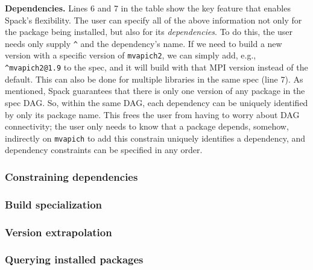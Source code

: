 {\bf Dependencies.}
Lines 6 and 7 in the table show the key feature that enables Spack's flexibility.
The user can specify all of the above information not only for the package being
installed, but also for its {\it dependencies}.  To do this, the user needs only supply 
\verb|^| and the dependency's name.  If we need to build a new version with a specific
version of {\tt mvapich2}, we can simply add, e.g., \verb|^mvapich2@1.9|
to the spec, and it will build with that MPI version instead of the default.
This can also be done for multiple libraries in the same spec (line 7).  
As mentioned, Spack guarantees that there is only one version of any package in 
the spec DAG.  So, within the same DAG, each dependency can be uniquely identified by 
only its package name.  This frees the user from having to worry about DAG connectivity;
the user only needs to know that a package depends, somehow, indirectly on {\tt mvapich}
to add this constrain
uniquely identifies a dependency, and dependency constraints can be specified in any
order.  


\subsubsection{Constraining dependencies}


\subsubsection{Build specialization}


\subsubsection{Version extrapolation}


\subsubsection{Querying installed packages}




